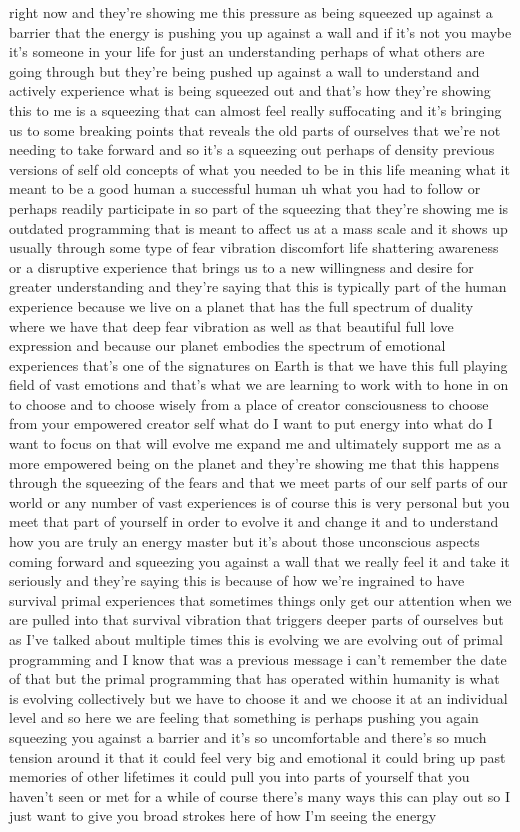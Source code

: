 \documentclass{article}
\begin{document}
right now and they're showing me this pressure as being squeezed up against a barrier that the energy is pushing you up against a wall and if it's not you maybe it's someone in your life for just an understanding perhaps of what others are going through but they're being pushed up against a wall to understand and actively experience what is being squeezed out and that's how they're showing this to me is a squeezing that can almost feel really suffocating and it's bringing us to some breaking points that reveals the old parts of ourselves that we're not needing to take forward and so it's a squeezing out perhaps of density previous versions of self old concepts of what you needed to be in this life meaning what it meant to be a good human a successful human uh what you had to follow or perhaps readily participate in so part of the squeezing that they're showing me is outdated programming that is meant to affect us at a mass scale and it shows up usually through some type of fear vibration discomfort life shattering awareness or a disruptive experience that brings us to a new willingness and desire for greater understanding and they're saying that this is typically part of the human experience because we live on a planet that has the full spectrum of duality where we have that deep fear vibration as well as that beautiful full love expression and because our planet embodies the spectrum of emotional experiences that's one of the signatures on Earth is that we have this full playing field of vast emotions and that's what we are learning to work with to hone in on to choose and to choose wisely from a place of creator consciousness to choose from your empowered creator self what do I want to put energy into what do I want to focus on that will evolve me expand me and ultimately support me as a more empowered being on the planet and they're showing me that this happens through the squeezing of the fears and that we meet parts of our self parts of our world or any number of vast experiences is of course this is very personal but you meet that part of yourself in order to evolve it and change it and to understand how you are truly an energy master but it's about those unconscious aspects coming forward and squeezing you against a wall that we really feel it and take it seriously and they're saying this is because of how we're ingrained to have survival primal experiences that sometimes things only get our attention when we are pulled into that survival vibration that triggers deeper parts of ourselves but as I've talked about multiple times this is evolving we are evolving out of primal programming and I know that was a previous message i can't remember the date of that but the primal programming that has operated within humanity is what is evolving collectively but we have to choose it and we choose it at an individual level and so here we are feeling that something is perhaps pushing you again squeezing you against a barrier and it's so uncomfortable and there's so much tension around it that it could feel very big and emotional it could bring up past memories of other lifetimes it could pull you into parts of yourself that you haven't seen or met for a while of course there's many ways this can play out so I just want to give you broad strokes here of how I'm seeing the energy 
\end{document}
